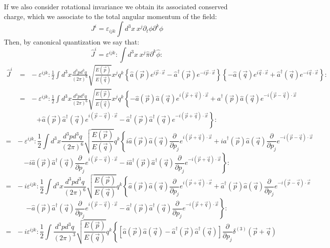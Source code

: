 \documentclass[12pt]{article}
\begin{document}
If we also consider rotational invariance we obtain its associated conserved charge, which we associate to the total angular momentum of the field:
\[
    J^i=\varepsilon_{ijk}\int d^3x ~ x^j \partial_t \phi \partial^k\phi
\]
Then, by canonical quantization we say that:
\[
    \hat{J}^i=\varepsilon^{ijk}:\int d^3x ~ x^j \hat{\pi} \partial^k\hat{\phi}:
\]
\[
    \begin{aligned}
        \hat{ J }^i &= ~~ -\varepsilon^{ijk}:\frac{1}{2}\int d^3x \frac{d^3pd^3q}{(2\pi)^6} \sqrt{\frac{E(\vec{p})}{E(\vec{q})}}x^jq^k\left\{\hat{a}(\vec{p})e^{i\vec{p}\cdot \vec{x}} - \hat{a}^\dagger(\vec{p})e^{-i\vec{p} \cdot \vec{x}}\right\}\left\{-\hat{a}(\vec{q})e^{i\vec{q} \cdot \vec{x}} + \hat{a}^\dagger(\vec{q})e^{-i\vec{q} \cdot \vec{x}}\right\}: \\
        &= ~~ -\varepsilon^{ijk}:\frac{1}{2}\int d^3x \frac{d^3pd^3q}{(2\pi)^6}\sqrt{\frac{E(\vec{p})}{E(\vec{q})}} x^jq^k\left\{-\hat{a}(\vec{p})\hat{a}(\vec{q})e^{i(\vec{p}+\vec{q})\cdot \vec{x}} + \hat{a}^\dagger(\vec{p})\hat{a}(\vec{q})e^{-i(\vec{p}-\vec{q}) \cdot \vec{x}}\right.
    \end{aligned}
\]
\[
    \left.+\hat{a}(\vec{p})\hat{a}^\dagger(\vec{q})e^{i(\vec{p}-\vec{q}) \cdot \vec{x}}-\hat{a}^\dagger(\vec{p})\hat{a}^\dagger(\vec{q})e^{-i(\vec{p}+\vec{q}) \cdot \vec{x}}\right\}:
\]
\[
    = ~~ -\varepsilon^{ijk}:\frac{1}{2}\int d^3x \frac{d^3pd^3q}{(2\pi)^6}\sqrt{\frac{E(\vec{p})}{E(\vec{q})}} q^k \left\{i\hat{a}(\vec{p})\hat{a}(\vec{q})\frac{\partial}{\partial p_j}e^{i(\vec{p}+\vec{q})\cdot \vec{x}} + i\hat{a}^\dagger(\vec{p})\hat{a}(\vec{q})\frac{\partial}{\partial p_j}e^{-i(\vec{p}-\vec{q}) \cdot \vec{x}}\right.
\]
\[
    \left.-i\hat{a}(\vec{p})\hat{a}^\dagger(\vec{q})\frac{\partial}{\partial p_j}e^{i(\vec{p}-\vec{q}) \cdot \vec{x}}-i\hat{a}^\dagger(\vec{p})\hat{a}^\dagger(\vec{q})\frac{\partial}{\partial p_j}e^{-i(\vec{p}+\vec{q}) \cdot \vec{x}}\right\}:
\]
\[
    = ~~ -i\varepsilon^{ijk}:\frac{1}{2}\int d^3x \frac{d^3pd^3q}{(2\pi)^6}\sqrt{\frac{E(\vec{p})}{E(\vec{q})}} q^k \left\{\hat{a}(\vec{p})\hat{a}(\vec{q})\frac{\partial}{\partial p_j}e^{i(\vec{p}+\vec{q})\cdot \vec{x}} + \hat{a}^\dagger(\vec{p})\hat{a}(\vec{q})\frac{\partial}{\partial p_j}e^{-i(\vec{p}-\vec{q}) \cdot \vec{x}}\right.
\]
\[
    \left.-\hat{a}(\vec{p})\hat{a}^\dagger(\vec{q})\frac{\partial}{\partial p_j}e^{i(\vec{p}-\vec{q}) \cdot \vec{x}}-\hat{a}^\dagger(\vec{p})\hat{a}^\dagger(\vec{q})\frac{\partial}{\partial p_j}e^{-i(\vec{p}+\vec{q}) \cdot \vec{x}}\right\}:
\]
\[
    = ~~ -i\varepsilon^{ijk}:\frac{1}{2}\int \frac{d^3pd^3q}{(2\pi)^3}\sqrt{\frac{E(\vec{p})}{E(\vec{q})}} q^k \left\{\left[\hat{a}(\vec{p})\hat{a}(\vec{q})-\hat{a}^\dagger(\vec{p})\hat{a}^\dagger(\vec{q})\right]\frac{\partial}{\partial p_j}\delta^{(3)}(\vec{p}+\vec{q}) \right.
\]
\end{document}
